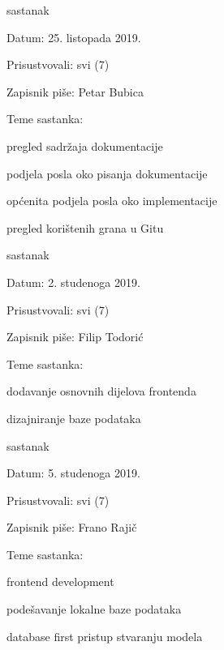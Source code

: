 \begin{packed_enum}
			\pagebreak

			\item  sastanak
			\item[] \begin{packed_item}
				\item Datum: 25. listopada 2019.
				\item Prisustvovali: svi (7)
				\item Zapisnik piše: Petar Bubica
				\item Teme sastanka:
				\begin{packed_item}
					\item pregled sadržaja dokumentacije
					\item podjela posla oko pisanja dokumentacije
					\item općenita podjela posla oko implementacije
					\item pregled korištenih grana u Gitu
				\end{packed_item}
			\end{packed_item}

			\item  sastanak
			\item[] \begin{packed_item}
				\item Datum: 2. studenoga 2019.
				\item Prisustvovali: svi (7)
				\item Zapisnik piše: Filip Todorić
				\item Teme sastanka:
				\begin{packed_item}
					\item dodavanje osnovnih dijelova frontenda
					\item dizajniranje baze podataka
				\end{packed_item}
			\end{packed_item}
			
			\item  sastanak
			\item[] \begin{packed_item}
				\item Datum: 5. studenoga 2019.
				\item Prisustvovali: svi (7)
				\item Zapisnik piše: Frano Rajič
				\item Teme sastanka:
				\begin{packed_item}
					\item frontend development
					\item podešavanje lokalne baze podataka
					\item database first pristup stvaranju modela
				\end{packed_item}
			\end{packed_item}
			

\end{packed_enum}
